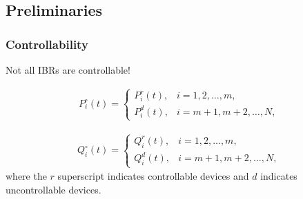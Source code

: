 \documentclass[
    aspectratio=169,
    \ifdefined\HANDOUT
    handout
    \else
    \fi
]{beamer}
\begin{document}
\subsection*{Preliminaries}
\begin{frame}
    \frametitle{Controllability}
    \begin{center}
        Not all IBRs are controllable!
    \end{center}
    \begin{align*}
        P_{i}^{\circ}(t)=\begin{cases} P_{i}^{r}(t), &i=1,2,\ldots, m,\\ P_{i}^{d}(t), &i=m+1,m+2,\ldots, N,\end{cases}
    \end{align*}

    \begin{align*}
        Q_{i}^{\circ}(t)=\begin{cases} Q_{i}^{r}(t), &i=1,2,\ldots, m,\\ Q_{i}^{d}(t), &i=m+1,m+2,\ldots, N,\end{cases}
    \end{align*}
    where the $r$ superscript indicates controllable devices and $d$ indicates
    uncontrollable devices.
\end{frame}
\end{document}
